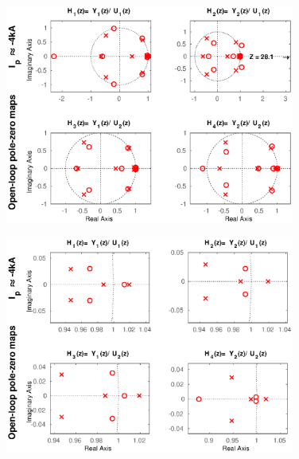 \begin{figure}
	\centering
	\includegraphics[width=0.85\textwidth]{Chp5/PoleZero/PoleZeroOpenNeg.eps}
	\label{PoleZeroOpenNeg}
\end{figure}	

\begin{figure}
	\centering
	\includegraphics[width=0.85\textwidth]{Chp5/PoleZero/PoleZeroOpenNegZoom.eps}
	\label{PoleZeroOpenNegZoom}
\end{figure}


